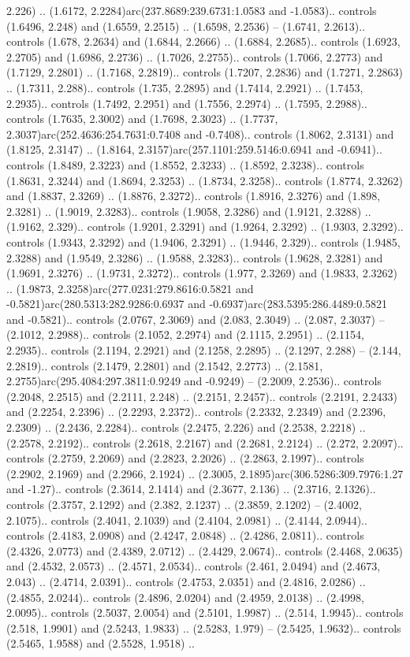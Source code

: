 2.226) .. (1.6172, 2.2284)arc(237.8689:239.6731:1.0583 and -1.0583).. controls (1.6496, 2.248) and (1.6559, 2.2515) .. (1.6598, 2.2536) -- (1.6741, 2.2613).. controls (1.678, 2.2634) and (1.6844, 2.2666) .. (1.6884, 2.2685).. controls (1.6923, 2.2705) and (1.6986, 2.2736) .. (1.7026, 2.2755).. controls (1.7066, 2.2773) and (1.7129, 2.2801) .. (1.7168, 2.2819).. controls (1.7207, 2.2836) and (1.7271, 2.2863) .. (1.7311, 2.288).. controls (1.735, 2.2895) and (1.7414, 2.2921) .. (1.7453, 2.2935).. controls (1.7492, 2.2951) and (1.7556, 2.2974) .. (1.7595, 2.2988).. controls (1.7635, 2.3002) and (1.7698, 2.3023) .. (1.7737, 2.3037)arc(252.4636:254.7631:0.7408 and -0.7408).. controls (1.8062, 2.3131) and (1.8125, 2.3147) .. (1.8164, 2.3157)arc(257.1101:259.5146:0.6941 and -0.6941).. controls (1.8489, 2.3223) and (1.8552, 2.3233) .. (1.8592, 2.3238).. controls (1.8631, 2.3244) and (1.8694, 2.3253) .. (1.8734, 2.3258).. controls (1.8774, 2.3262) and (1.8837, 2.3269) .. (1.8876, 2.3272).. controls (1.8916, 2.3276) and (1.898, 2.3281) .. (1.9019, 2.3283).. controls (1.9058, 2.3286) and (1.9121, 2.3288) .. (1.9162, 2.329).. controls (1.9201, 2.3291) and (1.9264, 2.3292) .. (1.9303, 2.3292).. controls (1.9343, 2.3292) and (1.9406, 2.3291) .. (1.9446, 2.329).. controls (1.9485, 2.3288) and (1.9549, 2.3286) .. (1.9588, 2.3283).. controls (1.9628, 2.3281) and (1.9691, 2.3276) .. (1.9731, 2.3272).. controls (1.977, 2.3269) and (1.9833, 2.3262) .. (1.9873, 2.3258)arc(277.0231:279.8616:0.5821 and -0.5821)arc(280.5313:282.9286:0.6937 and -0.6937)arc(283.5395:286.4489:0.5821 and -0.5821).. controls (2.0767, 2.3069) and (2.083, 2.3049) .. (2.087, 2.3037) -- (2.1012, 2.2988).. controls (2.1052, 2.2974) and (2.1115, 2.2951) .. (2.1154, 2.2935).. controls (2.1194, 2.2921) and (2.1258, 2.2895) .. (2.1297, 2.288) -- (2.144, 2.2819).. controls (2.1479, 2.2801) and (2.1542, 2.2773) .. (2.1581, 2.2755)arc(295.4084:297.3811:0.9249 and -0.9249) -- (2.2009, 2.2536).. controls (2.2048, 2.2515) and (2.2111, 2.248) .. (2.2151, 2.2457).. controls (2.2191, 2.2433) and (2.2254, 2.2396) .. (2.2293, 2.2372).. controls (2.2332, 2.2349) and (2.2396, 2.2309) .. (2.2436, 2.2284).. controls (2.2475, 2.226) and (2.2538, 2.2218) .. (2.2578, 2.2192).. controls (2.2618, 2.2167) and (2.2681, 2.2124) .. (2.272, 2.2097).. controls (2.2759, 2.2069) and (2.2823, 2.2026) .. (2.2863, 2.1997).. controls (2.2902, 2.1969) and (2.2966, 2.1924) .. (2.3005, 2.1895)arc(306.5286:309.7976:1.27 and -1.27).. controls (2.3614, 2.1414) and (2.3677, 2.136) .. (2.3716, 2.1326).. controls (2.3757, 2.1292) and (2.382, 2.1237) .. (2.3859, 2.1202) -- (2.4002, 2.1075).. controls (2.4041, 2.1039) and (2.4104, 2.0981) .. (2.4144, 2.0944).. controls (2.4183, 2.0908) and (2.4247, 2.0848) .. (2.4286, 2.0811).. controls (2.4326, 2.0773) and (2.4389, 2.0712) .. (2.4429, 2.0674).. controls (2.4468, 2.0635) and (2.4532, 2.0573) .. (2.4571, 2.0534).. controls (2.461, 2.0494) and (2.4673, 2.043) .. (2.4714, 2.0391).. controls (2.4753, 2.0351) and (2.4816, 2.0286) .. (2.4855, 2.0244).. controls (2.4896, 2.0204) and (2.4959, 2.0138) .. (2.4998, 2.0095).. controls (2.5037, 2.0054) and (2.5101, 1.9987) .. (2.514, 1.9945).. controls (2.518, 1.9901) and (2.5243, 1.9833) .. (2.5283, 1.979) -- (2.5425, 1.9632).. controls (2.5465, 1.9588) and (2.5528, 1.9518) .. 